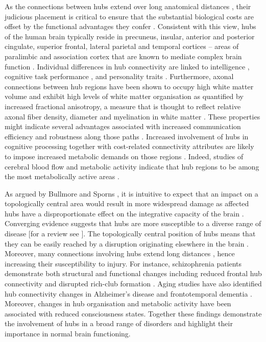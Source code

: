 As the connections between hubs extend over long anatomical distances \citep{Fulcher2016,Towlson2013,VandenHeuvel2011}, their judicious placement is critical to ensure that the substantial biological costs are offset by the functional advantages they confer \citep{DeReus2014,Towlson2013}. Consistent with this view, hubs of the human brain typically reside in precuneus, insular, anterior and posterior cingulate, superior frontal, lateral parietal and temporal cortices \citep{Gong2009,VandenHeuvel2012,VandenHeuvel2013a} -- areas of paralimbic and association cortex that are known to mediate complex brain function \citep{Buckner2009,Mesulam1998}. Individual differences in hub connectivity are linked to intelligence \citep{Li2009,VandenHeuvel2009}, cognitive task performance \citep{Cole2012}, and personality traits \citep{Adelstein2011}. Furthermore, axonal connections between hub regions have been shown to occupy high white matter volume and exhibit high levels of white matter organisation as quantified by increased fractional anisotropy, a measure that is thought to reflect relative axonal fiber density, diameter and myelination in white matter \citep{Collin2014}. These properties might indicate several advantages associated with increased communication efficiency and robustness along those paths \citep{Collin2014}. Increased involvement of hubs in cognitive processing \citep{Buckner2009,Cole2012,Mesulam1998} together with cost-related connectivity attributes are likely to impose increased metabolic demands on those regions \citep{Collin2014}. Indeed, studies of cerebral blood flow and metabolic activity indicate that hub regions to be among the most metabolically active areas \citep{Vaishnavi2010,Varkuti2011}. 


As argued by Bullmore and Sporns \citep{Bullmore2012}, it is intuitive to expect that an impact on a topologically central area would result in more widespread damage as affected hubs have a disproportionate effect on the integrative capacity of the brain \citep{DeReus2014}. Converging evidence suggests that hubs are more susceptible to a diverse range of disease [for a review see \citet{Bassett2009a,Crossley2014,Fornito2015}]. The topologically central position of hubs means that they can be easily reached by a disruption originating elsewhere in the brain \citep{Zhou2012}. Moreover, many connections involving hubs extend long distances \citep{VandenHeuvel2012}, hence increasing their susceptibility to injury. For instance, schizophrenia patients demonstrate both structural and functional changes including reduced frontal hub connectivity \citep{Fornito2012a,VandenHeuvel2010,Zalesky2011} and disrupted rich-club formation \citep{VandenHeuvel2013c}. Aging studies have also identified hub connectivity changes in Alzheimer’s disease \citep{DeHaan2012,Stam2009} and frontotemporal dementia \citep{Agosta2013}. Moreover, changes in hub organisation \citep{Achard2012} and metabolic activity \citep{Laureys2004} have been associated with reduced consciousness states. Together these findings demonstrate the involvement of hubs in a broad range of disorders and highlight their importance in normal brain functioning. 


